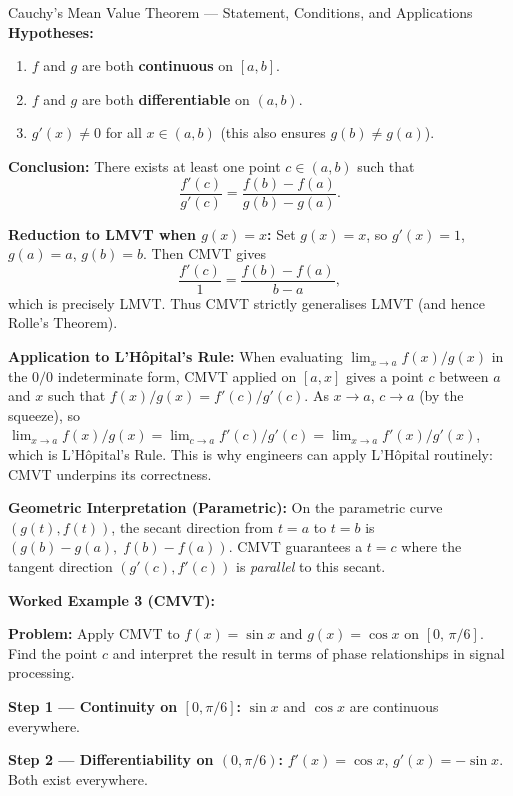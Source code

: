 \documentclass[12pt,a4paper]{article}
\begin{document}
\begin{infobox}{Cauchy's Mean Value Theorem --- Statement, Conditions, and Applications}
\textbf{Hypotheses:}
\begin{enumerate}
  \item $f$ and $g$ are both \textbf{continuous} on $[a, b]$.
  \item $f$ and $g$ are both \textbf{differentiable} on $(a, b)$.
  \item $g'(x) \neq 0$ for all $x \in (a, b)$ \quad (this also ensures $g(b) \neq g(a)$).
\end{enumerate}

\textbf{Conclusion:} There exists at least one point $c \in (a, b)$ such that
\[
  \boxed{\frac{f'(c)}{g'(c)} = \frac{f(b) - f(a)}{g(b) - g(a)}.}
\]

\textbf{Reduction to LMVT when $g(x) = x$:}
Set $g(x) = x$, so $g'(x) = 1$, $g(a) = a$, $g(b) = b$. Then CMVT gives
\[
  \frac{f'(c)}{1} = \frac{f(b) - f(a)}{b - a},
\]
which is precisely LMVT. Thus CMVT strictly generalises LMVT (and hence Rolle's Theorem).

\textbf{Application to L'H\^{o}pital's Rule:}
When evaluating $\lim_{x \to a} f(x)/g(x)$ in the $0/0$ indeterminate form,
CMVT applied on $[a, x]$ gives a point $c$ between $a$ and $x$ such that
$f(x)/g(x) = f'(c)/g'(c)$.
As $x \to a$, $c \to a$ (by the squeeze), so
$\lim_{x\to a} f(x)/g(x) = \lim_{c \to a} f'(c)/g'(c) = \lim_{x \to a} f'(x)/g'(x)$,
which is L'H\^{o}pital's Rule. This is why engineers can apply L'H\^{o}pital
routinely: CMVT underpins its correctness.

\textbf{Geometric Interpretation (Parametric):}
On the parametric curve $(g(t), f(t))$, the secant direction from $t=a$ to $t=b$ is
$(g(b)-g(a),\; f(b)-f(a))$. CMVT guarantees a $t=c$ where the tangent direction
$(g'(c), f'(c))$ is \emph{parallel} to this secant.
\end{infobox}

\textbf{Worked Example 3 (CMVT):}

\medskip
\noindent\textbf{Problem:} Apply CMVT to $f(x) = \sin x$ and $g(x) = \cos x$ on
$[0,\, \pi/6]$. Find the point $c$ and interpret the result in terms of phase
relationships in signal processing.

\medskip
\textbf{Step 1 --- Continuity on $[0, \pi/6]$:}
$\sin x$ and $\cos x$ are continuous everywhere. \checkmark

\textbf{Step 2 --- Differentiability on $(0, \pi/6)$:}
$f'(x) = \cos x$, $g'(x) = -\sin x$. Both exist everywhere. \checkmark
\end{document}

